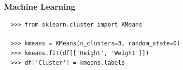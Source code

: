 \documentclass{beamer}
\begin{document}
\begin{frame}[fragile]
\frametitle{Machine Learning}
\begin{center}
  \begin{verbatim}
  >>> from sklearn.cluster import KMeans

  >>> kmeans = KMeans(n_clusters=3, random_state=0)
  >>> kmeans.fit(df[['Height', 'Weight']])
  >>> df['Cluster'] = kmeans.labels_
  \end{verbatim}
\end{center}
\end{frame}

\end{document}

